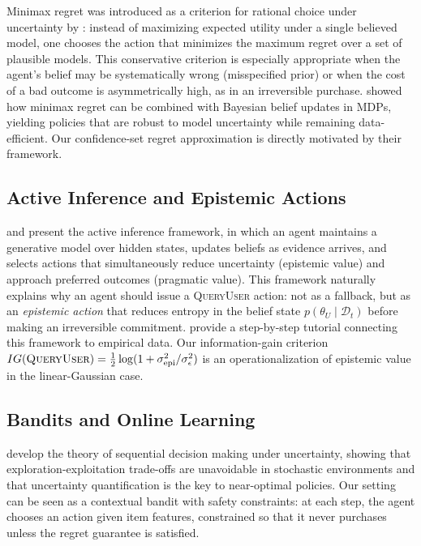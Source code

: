 \documentclass[11pt,letterpaper]{article}
\newcommand{\QueryUser}{\textsc{QueryUser}}
\newcommand{\thetaU}{\theta_U}
\begin{document}
Minimax regret was introduced as a criterion for rational choice under uncertainty by \citet{regretDecision1982}: instead of maximizing expected utility under a single believed model, one chooses the action that minimizes the maximum regret over a set of plausible models.  This conservative criterion is especially appropriate when the agent's belief may be systematically wrong (misspecified prior) or when the cost of a bad outcome is asymmetrically high, as in an irreversible purchase.  \citet{rigter2020minimax} showed how minimax regret can be combined with Bayesian belief updates in MDPs, yielding policies that are robust to model uncertainty while remaining data-efficient.  Our confidence-set regret approximation is directly motivated by their framework.

\subsection{Active Inference and Epistemic Actions}

\citet{bogacz2017tutorial} and \citet{friston2017active} present the active inference framework, in which an agent maintains a generative model over hidden states, updates beliefs as evidence arrives, and selects actions that simultaneously reduce uncertainty (epistemic value) and approach preferred outcomes (pragmatic value).  This framework naturally explains why an agent should issue a \QueryUser{} action: not as a fallback, but as an \emph{epistemic action} that reduces entropy in the belief state $p(\thetaU \mid \mathcal{D}_t)$ before making an irreversible commitment.  \citet{smith2022active} provide a step-by-step tutorial connecting this framework to empirical data.  Our information-gain criterion $IG(\QueryUser) = \frac{1}{2}\log(1 + \sigma_{\mathrm{epi}}^2 / \sigma_\epsilon^2)$ is an operationalization of epistemic value in the linear-Gaussian case.

\subsection{Bandits and Online Learning}

\citet{lattimore2020bandit} develop the theory of sequential decision making under uncertainty, showing that exploration-exploitation trade-offs are unavoidable in stochastic environments and that uncertainty quantification is the key to near-optimal policies.  Our setting can be seen as a contextual bandit with safety constraints: at each step, the agent chooses an action given item features, constrained so that it never purchases unless the regret guarantee is satisfied.
\end{document}
